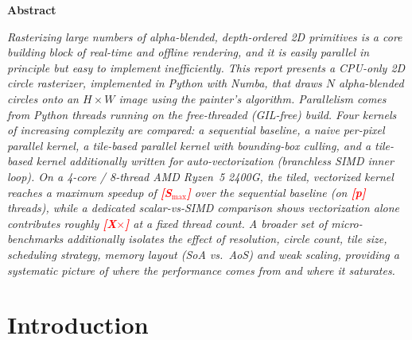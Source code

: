 \documentclass[10pt,twocolumn,letterpaper]{article}
\newcommand{\tbd}[1]{\textcolor{red}{\textbf{[#1]}}}
\begin{document}

\begin{center}\large\textbf{Abstract}\end{center}
\vspace{-4pt}
\begin{list}{}{\setlength{\leftmargin}{1.5em}\setlength{\rightmargin}{1.5em}}\item[]
\small\itshape
  Rasterizing large numbers of alpha-blended, depth-ordered 2D primitives is a core building
  block of real-time and offline rendering, and it is easily parallel in principle but
  easy to implement inefficiently. This report presents a CPU-only 2D circle rasterizer,
  implemented in Python with Numba, that draws $N$ alpha-blended circles onto an $H\times W$
  image using the painter's algorithm. Parallelism comes from Python threads
  running on the free-threaded (GIL-free) build.
  Four kernels of increasing complexity are compared:
  a sequential baseline, a naive per-pixel parallel kernel, a tile-based parallel kernel with
  bounding-box culling, and a tile-based kernel additionally written for auto-vectorization
  (branchless SIMD inner loop). On a 4-core / 8-thread AMD Ryzen~5 2400G, the tiled, vectorized
  kernel reaches a maximum speedup of \tbd{S$_{\max}$} over the sequential baseline (on
  \tbd{p} threads), while a dedicated scalar-vs-SIMD comparison shows vectorization
  alone contributes roughly \tbd{X$\times$} at a fixed thread count. A broader set of
  micro-benchmarks additionally isolates the effect of resolution, circle count, tile size,
  scheduling strategy, memory layout (SoA vs.\ AoS) and weak scaling, providing a systematic picture of where the
  performance comes from and where it saturates.
  \end{list}

\section{Introduction}
\end{document}
